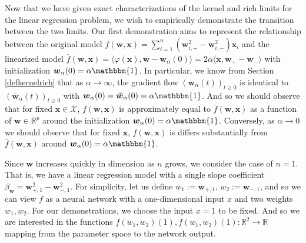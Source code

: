 \documentclass{article}
\begin{document}
Now that we have given exact characterizations of the kernel and rich limits for the linear regression problem, we wish to empirically demonstrate the transition between the two limits. Our first demonstration aims to represent the relationship between the original model $f(\boldsymbol{w}, \boldsymbol{x}) = \sum_{i=1}^n (\boldsymbol{w}_{i,+}^2 - \boldsymbol{w}_{i,-}^2)\boldsymbol{x}_i$ and the linearized model $\bar{f}(\boldsymbol{w}, \boldsymbol{x}) = \langle \varphi(\boldsymbol{x}), \boldsymbol{w} - \boldsymbol{w}_{\alpha}(0) \rangle = 2\alpha \langle \boldsymbol{x} , \boldsymbol{w}_+ -  \boldsymbol{w}_-\rangle$ with initialization $\boldsymbol{w}_{\alpha}(0) = \alpha \mathbbm{1}$. In particular, we know from Section \ref{defkernelrich} that as $\alpha \rightarrow \infty$, the gradient flow $(\boldsymbol{w}_{\alpha}(t))_{t \geq 0}$ is identical to $(\boldsymbol{\bar{w}}_{\alpha}(t))_{t \geq 0}$ with $\boldsymbol{w}_{\alpha}(0) = \boldsymbol{\bar{w}}_{\alpha}(0) = \alpha \mathbbm{1}$. And so we should observe that for fixed $\boldsymbol{x} \in \mathcal{X}$, $f(\boldsymbol{w}, \boldsymbol{x})$ is approximately equal to $\bar{f}(\boldsymbol{w}, \boldsymbol{x})$ as a function of $\boldsymbol{w} \in \mathbb{R}^p$ around the initialization $\boldsymbol{w}_{\alpha}(0) = \alpha \mathbbm{1}$. Conversely, as $\alpha \rightarrow 0$ we should observe that for fixed $\boldsymbol{x}$, $f(\boldsymbol{w}, \boldsymbol{x})$ is differs substantially from $\bar{f}(\boldsymbol{w}, \boldsymbol{x})$ around $\boldsymbol{w}_{\alpha}(0) = \alpha \mathbbm{1}$.

Since $\boldsymbol{w}$ increases quickly in dimension as $n$ grows, we consider the case of $n =1$. That is, we have a linear regression model with a single slope coefficient $\beta_{\boldsymbol{w}} = \boldsymbol{w}_{+, 1}^2 - \boldsymbol{w}_{-, 1}^2$. For simplicity, let us define $w_1 := \boldsymbol{w}_{+, 1}$, $w_2 := \boldsymbol{w}_{-, 1}$, and so we can view $f$ as a neural network with a one-dimensional input $x$ and two weights $w_1, w_2$. For our demonstrations, we choose the input $x = 1$ to be fixed. And so we are interested in the functions $f(w_1, w_2)(1), \bar{f}(w_1, w_2)(1): \mathbb{R}^2 \rightarrow \mathbb{R}$ mapping from the parameter space to the network output.
\end{document}
